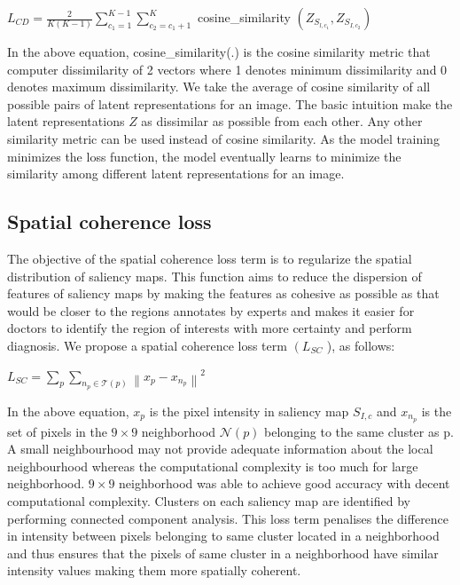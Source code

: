 \begin{center}
{ $L_{C D}=\frac{2}{K(K-1)} \sum_{c_{1}=1}^{K-1} \sum_{c_{2}=c_{1}+1}^{K}$ cosine\_similarity $\left(Z_{S_{l, c_{1}}}, Z_{S_{I, c_{2}}}\right)$}
\end{center}


In the above equation, cosine\_similarity(.) is the cosine similarity metric that computer dissimilarity of 2 vectors where 1 denotes minimum dissimilarity and  0 denotes maximum dissimilarity. We take the average of cosine similarity of all possible pairs of latent representations for an image. The basic intuition make the latent representations $Z$ as dissimilar as possible from each other. Any other similarity metric can be used instead of cosine similarity. As the model training minimizes the loss function, the model eventually learns to minimize the similarity among different latent representations for an image. 

\subsection{Spatial coherence loss}

The objective of the spatial coherence loss term is to regularize the spatial distribution of saliency maps. This function aims to reduce the dispersion of features of saliency maps by making the features as cohesive as possible as that would be closer to the regions annotates by experts and makes it easier for doctors to identify the region of interests with more certainty and perform diagnosis. We propose a spatial coherence loss term $\left(L_{S C}\right.$ ), as follows:

\begin{center}
{$L_{S C}=\sum_{p} \sum_{n_{p} \in \mathscr{T}(p)}\left\|x_{p}-x_{n_{p}}\right\|^{2}$}
\end{center}

In the above equation, $x_{p}$ is the pixel intensity in saliency map $S_{I, c}$ and $x_{n_{p}}$ is the set of pixels in the $9 \times 9$ neighborhood $\mathscr{N}(p)$ belonging to the same cluster as p. 
A small neighbourhood may not provide adequate information about the local neighbourhood whereas the computational complexity is too much for large neighborhood. $9 \times 9$ neighborhood was able to achieve good accuracy with decent computational complexity. Clusters on each saliency map are identified by performing connected component analysis. This loss term penalises the difference in intensity between pixels belonging to same cluster located in a neighborhood and thus ensures that the pixels of same cluster in a neighborhood have similar intensity values making them more spatially coherent.

